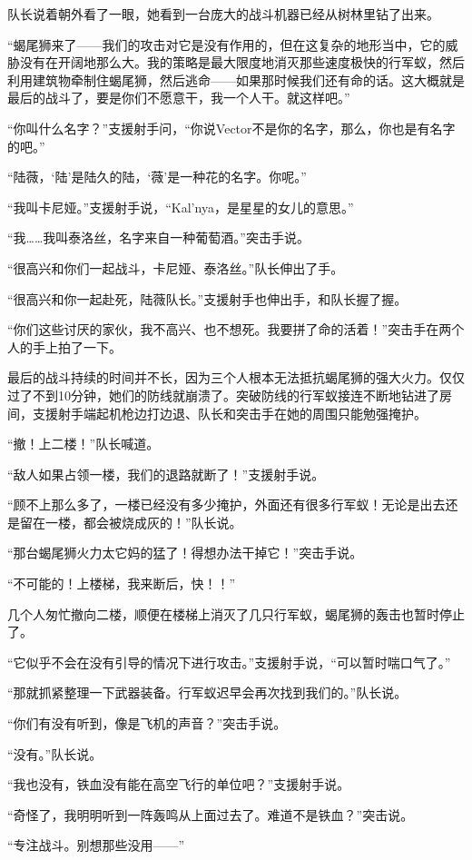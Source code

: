 队长说着朝外看了一眼，她看到一台庞大的战斗机器已经从树林里钻了出来。

“蝎尾狮来了——我们的攻击对它是没有作用的，但在这复杂的地形当中，它的威胁没有在开阔地那么大。我的策略是最大限度地消灭那些速度极快的行军蚁，然后利用建筑物牵制住蝎尾狮，然后逃命——如果那时候我们还有命的话。这大概就是最后的战斗了，要是你们不愿意干，我一个人干。就这样吧。”

“你叫什么名字？”支援射手问，“你说Vector不是你的名字，那么，你也是有名字的吧。”

“陆薇，‘陆’是陆久的陆，‘薇’是一种花的名字。你呢。”

“我叫卡尼娅。”支援射手说，“Kal'nya，是星星的女儿的意思。”

“我……我叫泰洛丝，名字来自一种葡萄酒。”突击手说。

“很高兴和你们一起战斗，卡尼娅、泰洛丝。”队长伸出了手。

“很高兴和你一起赴死，陆薇队长。”支援射手也伸出手，和队长握了握。

“你们这些讨厌的家伙，我不高兴、也不想死。我要拼了命的活着！”突击手在两个人的手上拍了一下。

最后的战斗持续的时间并不长，因为三个人根本无法抵抗蝎尾狮的强大火力。仅仅过了不到10分钟，她们的防线就崩溃了。突破防线的行军蚁接连不断地钻进了房间，支援射手端起机枪边打边退、队长和突击手在她的周围只能勉强掩护。

“撤！上二楼！”队长喊道。

“敌人如果占领一楼，我们的退路就断了！”支援射手说。

“顾不上那么多了，一楼已经没有多少掩护，外面还有很多行军蚁！无论是出去还是留在一楼，都会被烧成灰的！”队长说。

“那台蝎尾狮火力太它妈的猛了！得想办法干掉它！”突击手说。

“不可能的！上楼梯，我来断后，快！！”

几个人匆忙撤向二楼，顺便在楼梯上消灭了几只行军蚁，蝎尾狮的轰击也暂时停止了。

“它似乎不会在没有引导的情况下进行攻击。”支援射手说，“可以暂时喘口气了。”

“那就抓紧整理一下武器装备。行军蚁迟早会再次找到我们的。”队长说。

“你们有没有听到，像是飞机的声音？”突击手说。

“没有。”队长说。

“我也没有，铁血没有能在高空飞行的单位吧？”支援射手说。

“奇怪了，我明明听到一阵轰鸣从上面过去了。难道不是铁血？”突击说。

“专注战斗。别想那些没用——”

